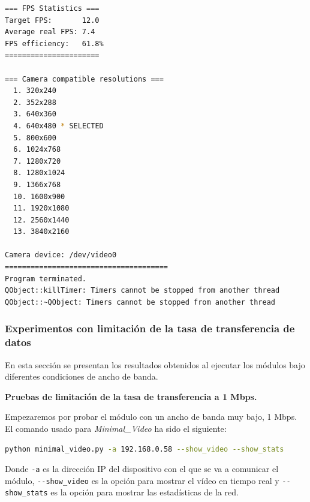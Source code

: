 \begin{lstlisting}[language=bash,basicstyle=\ttfamily\scriptsize]
=== FPS Statistics ===
Target FPS:       12.0
Average real FPS: 7.4
FPS efficiency:   61.8%
======================

=== Camera compatible resolutions ===
  1. 320x240
  2. 352x288
  3. 640x360
  4. 640x480 * SELECTED
  5. 800x600
  6. 1024x768
  7. 1280x720
  8. 1280x1024
  9. 1366x768
  10. 1600x900
  11. 1920x1080
  12. 2560x1440
  13. 3840x2160

Camera device: /dev/video0
======================================
Program terminated.
QObject::killTimer: Timers cannot be stopped from another thread
QObject::~QObject: Timers cannot be stopped from another thread
\end{lstlisting}
\vspace{\baselineskip}

\newpage

\subsubsection{Experimentos con limitación de la tasa de transferencia de datos}

En esta sección se presentan los resultados obtenidos al ejecutar los módulos bajo diferentes condiciones de ancho de banda. 
\vspace{\baselineskip}

\textbf{Pruebas de limitación de la tasa de transferencia a 1 Mbps.}
\vspace{\baselineskip}

Empezaremos por probar el módulo con un ancho de banda muy bajo, 1 Mbps. El comando usado para \textit{Minimal\_Video} ha sido el siguiente:

\begin{lstlisting}[language=bash]
python minimal_video.py -a 192.168.0.58 --show_video --show_stats
\end{lstlisting}
Donde \verb|-a| es la dirección IP del dispositivo con el que se va a comunicar el módulo, \verb|--show_video| es la opción para mostrar el vídeo en tiempo real y \verb|--show_stats| es la opción para mostrar las estadísticas de la red.
\vspace{\baselineskip}

